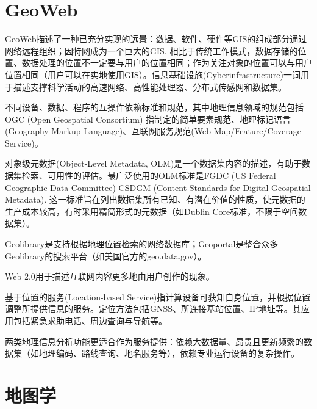 \section{GeoWeb}

\par GeoWeb描述了一种已充分实现的远景：数据、软件、硬件等GIS的组成部分通过网络远程组织；因特网成为一个巨大的GIS. 相比于传统工作模式，数据存储的位置、数据处理的位置不一定要与用户的位置相同；作为关注对象的位置可以与用户位置相同（用户可以在实地使用GIS）。信息基础设施(Cyberinfrastructure)一词用于描述支撑科学活动的高速网络、高性能处理器、分布式传感网和数据集。

\par 不同设备、数据、程序的互操作依赖标准和规范，其中地理信息领域的规范包括OGC (Open Geospatial Consortium) 指制定的简单要素规范、地理标记语言(Geography Markup Language)、互联网服务规范(Web Map/Feature/Coverage Service)。

\par 对象级元数据(Object-Level Metadata, OLM)是一个数据集内容的描述，有助于数据集检索、可用性的评估。最广泛使用的OLM标准是FGDC (US Federal Geographic Data Committee) CSDGM (Content Standards for Digital Geospatial Metadata). 这一标准旨在列出数据集所有已知、有潜在价值的性质，使元数据的生产成本较高，有时采用精简形式的元数据（如Dublin Core标准，不限于空间数据集）。

\par Geolibrary是支持根据地理位置检索的网络数据库；Geoportal是整合众多Geolibrary的搜索平台（如美国官方的geo.data.gov）。

\par Web 2.0用于描述互联网内容更多地由用户创作的现象。

\par 基于位置的服务(Location-based Service)指计算设备可获知自身位置，并根据位置调整所提供信息的服务。定位方法包括GNSS、所连接基站位置、IP地址等。其应用包括紧急求助电话、周边查询与导航等。

\par 两类地理信息分析功能更适合作为服务提供：依赖大数据量、昂贵且更新频繁的数据集（如地理编码、路线查询、地名服务等），依赖专业运行设备的复杂操作。

\section{地图学}
